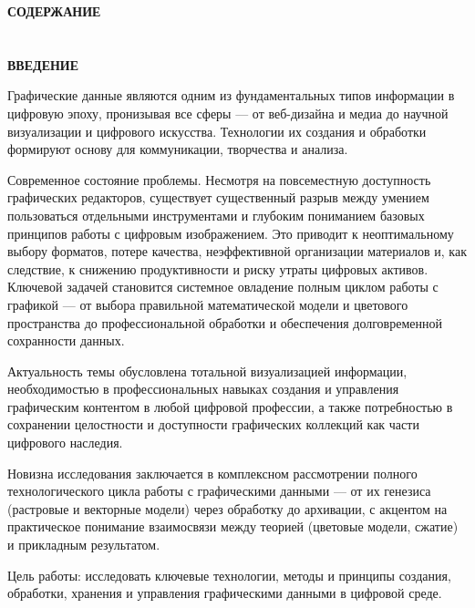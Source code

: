 \documentclass{SibFU-docs}
\begin{document}
\newpage

\thispagestyle{empty}
\begin{center}
\bfseries СОДЕРЖАНИЕ
\end{center}
\vspace{-6pt}
\tableofcontents
\clearpage

\section*{}
\vspace*{-2.5em}
\begin{center}\textbf{ВВЕДЕНИЕ}\end{center}
{}

Графические данные являются одним из фундаментальных типов информации в цифровую эпоху, пронизывая все сферы — от веб-дизайна и медиа до научной визуализации и цифрового искусства. Технологии их создания и обработки формируют основу для коммуникации, творчества и анализа.

Современное состояние проблемы. Несмотря на повсеместную доступность графических редакторов, существует существенный разрыв между умением пользоваться отдельными инструментами и глубоким пониманием базовых принципов работы с цифровым изображением. Это приводит к неоптимальному выбору форматов, потере качества, неэффективной организации материалов и, как следствие, к снижению продуктивности и риску утраты цифровых активов. Ключевой задачей становится системное овладение полным циклом работы с графикой — от выбора правильной математической модели и цветового пространства до профессиональной обработки и обеспечения долговременной сохранности данных.

Актуальность темы обусловлена тотальной визуализацией информации, необходимостью в профессиональных навыках создания и управления графическим контентом в любой цифровой профессии, а также потребностью в сохранении целостности и доступности графических коллекций как части цифрового наследия.

Новизна исследования заключается в комплексном рассмотрении полного технологического цикла работы с графическими данными — от их генезиса (растровые и векторные модели) через обработку до архивации, с акцентом на практическое понимание взаимосвязи между теорией (цветовые модели, сжатие) и прикладным результатом.

Цель работы: исследовать ключевые технологии, методы и принципы создания, обработки, хранения и управления графическими данными в цифровой среде.
\end{document}
